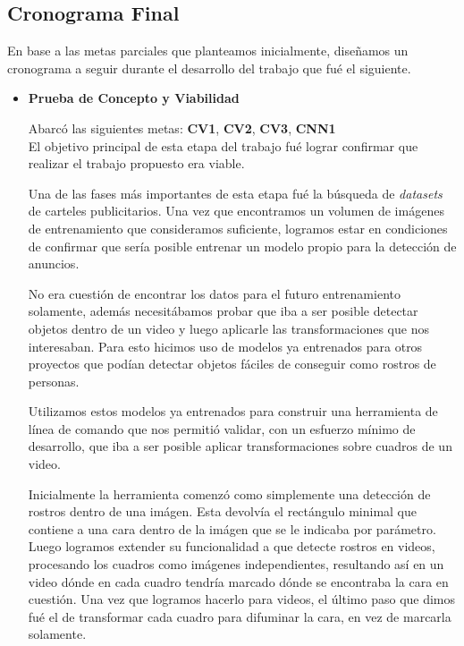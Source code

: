 \documentclass[a4paper]{article}
\begin{document}
\subsection{Cronograma Final}

En base a las metas parciales que planteamos inicialmente, diseñamos un cronograma a seguir durante el desarrollo del trabajo que fué el siguiente.

\begin{itemize}
\item \textbf{Prueba de Concepto y Viabilidad}

Abarcó las siguientes metas: \textbf{CV1}, \textbf{CV2}, \textbf{CV3}, \textbf{CNN1} \\

El objetivo principal de esta etapa del trabajo fué lograr confirmar que realizar el trabajo propuesto era viable.

Una de las fases más importantes de esta etapa fué la búsqueda de \textit{datasets} de carteles publicitarios. Una vez que encontramos un volumen de imágenes de entrenamiento que consideramos suficiente, logramos estar en condiciones de confirmar que sería posible entrenar un modelo propio para la detección de anuncios.

No era cuestión de encontrar los datos para el futuro entrenamiento solamente, además necesitábamos probar que iba a ser posible detectar objetos dentro de un video y luego aplicarle las transformaciones que nos interesaban. Para esto hicimos uso de modelos ya entrenados para otros proyectos que podían detectar objetos fáciles de conseguir como rostros de personas.

Utilizamos estos modelos ya entrenados para construir una herramienta de línea de comando que nos permitió validar, con un esfuerzo mínimo de desarrollo, que iba a ser posible aplicar transformaciones sobre cuadros de un video.

Inicialmente la herramienta comenzó como simplemente una detección de rostros dentro de una imágen. Esta devolvía el rectángulo minimal que contiene a una cara dentro de la imágen que se le indicaba por parámetro.
Luego logramos extender su funcionalidad a que detecte rostros en videos, procesando los cuadros como imágenes independientes, resultando así en un video dónde en cada cuadro tendría marcado dónde se encontraba la cara en cuestión.
Una vez que logramos hacerlo para videos, el último paso que dimos fué el de transformar cada cuadro para difuminar la cara, en vez de marcarla solamente.


\end{itemize}
\end{document}
